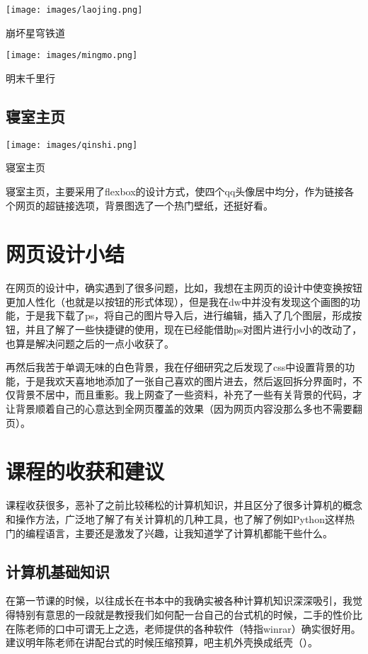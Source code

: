 \documentclass[supercite]{Experimental_Report}
\theoremstyle{definition}
\begin{document}
\texttt{[image: images/laojing.png]}
\caption{崩坏星穹铁道}
\label{fig3-3-1}


\texttt{[image: images/mingmo.png]}
\caption{明末千里行}
\label{fig3-3-2}

\subsection{寝室主页}

\texttt{[image: images/qinshi.png]}
\caption{寝室主页}
\label{fig3-4}

寝室主页，主要采用了flexbox的设计方式，使四个qq头像居中均分，作为链接各个网页的超链接选项，背景图选了一个热门壁纸，还挺好看。

\newpage

\section{网页设计小结}

在网页的设计中，确实遇到了很多问题，比如，我想在主网页的设计中使变换按钮更加人性化（也就是以按钮的形式体现），但是我在dw中并没有发现这个画图的功能，于是我下载了ps，将自己的图片导入后，进行编辑，插入了几个图层，形成按钮，并且了解了一些快捷键的使用，现在已经能借助ps对图片进行小小的改动了，也算是解决问题之后的一点小收获了。

再然后我苦于单调无味的白色背景，我在仔细研究之后发现了css中设置背景的功能，于是我欢天喜地地添加了一张自己喜欢的图片进去，然后返回拆分界面时，不仅背景不居中，而且重影。我上网查了一些资料，补充了一些有关背景的代码，才让背景顺着自己的心意达到全网页覆盖的效果（因为网页内容没那么多也不需要翻页）。

\newpage

\section{课程的收获和建议}

课程收获很多，恶补了之前比较稀松的计算机知识，并且区分了很多计算机的概念和操作方法，广泛地了解了有关计算机的几种工具，也了解了例如Python这样热门的编程语言，主要还是激发了兴趣，让我知道学了计算机都能干些什么。

\subsection{计算机基础知识}

在第一节课的时候，以往成长在书本中的我确实被各种计算机知识深深吸引，我觉得特别有意思的一段就是教授我们如何配一台自己的台式机的时候，二手的性价比在陈老师的口中可谓无上之选，老师提供的各种软件（特指winrar）确实很好用。建议明年陈老师在讲配台式的时候压缩预算，吧主机外壳换成纸壳（）。
\end{document}
